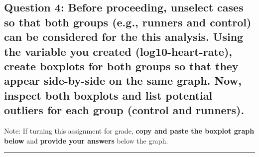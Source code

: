\documentclass[11pt,]{article}
\begin{document}
\hypertarget{question-4-before-proceeding-unselect-cases-so-that-both-groups-e.g.-runners-and-control-can-be-considered-for-the-this-analysis.-using-the-variable-you-created-log10-heart-rate-create-boxplots-for-both-groups-so-that-they-appear-side-by-side-on-the-same-graph.-now-inspect-both-boxplots-and-list-potential-outliers-for-each-group-control-and-runners.}{%
\subsection{\texorpdfstring{\textbf{Question 4}: Before proceeding,
unselect cases so that both groups (e.g., runners and control) can be
considered for the this analysis. Using the variable you created
(log10-heart-rate), create boxplots for both groups so that they appear
side-by-side on the same graph. Now, inspect both boxplots and list
potential outliers for each group (control and
runners).}{Question 4: Before proceeding, unselect cases so that both groups (e.g., runners and control) can be considered for the this analysis. Using the variable you created (log10-heart-rate), create boxplots for both groups so that they appear side-by-side on the same graph. Now, inspect both boxplots and list potential outliers for each group (control and runners).}}\label{question-4-before-proceeding-unselect-cases-so-that-both-groups-e.g.-runners-and-control-can-be-considered-for-the-this-analysis.-using-the-variable-you-created-log10-heart-rate-create-boxplots-for-both-groups-so-that-they-appear-side-by-side-on-the-same-graph.-now-inspect-both-boxplots-and-list-potential-outliers-for-each-group-control-and-runners.}}

Note: If turning this assignment for grade, \textbf{copy and paste the
boxplot graph below} and \textbf{provide your answers} below the graph.

\begin{center}\rule{0.5\linewidth}{0.5pt}\end{center}
\end{document}
